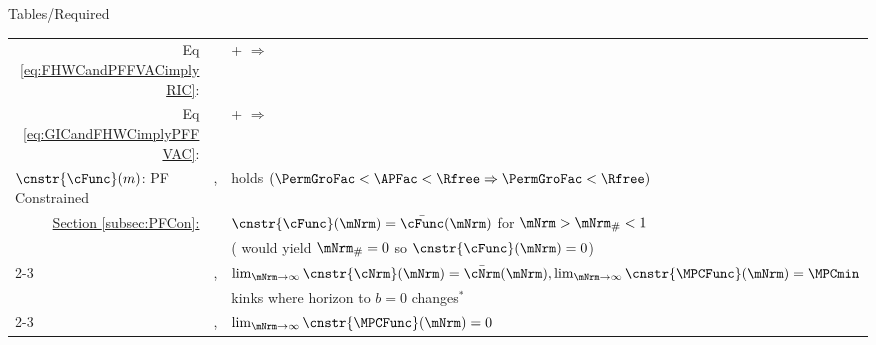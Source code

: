\documentclass[\econtexRoot/BufferStockTheory]{subfiles}
\providecommand{\TblName}{}
\renewcommand{\TblName}{Required}
\begin{document}
\begin{verbatimwrite}{Tables/\TblName}
\begin{table}
{\begin{tabular}{|l|l|l|}
        \\ \multicolumn{1}{|r|}{Eq \eqref{eq:FHWCandPFFVACimplyRIC}:}                                                                              &                                         & {\PFFVAC}+{\FHWC} $\Rightarrow$ {\RIC}         
        \\ \multicolumn{1}{|r|}{{Eq \eqref{eq:GICandFHWCimplyPFFVAC}}:}                                                                              &                                         & {\GICRaw}+{\FHWC} $\Rightarrow$ {\PFFVAC}         
        \\ \hline\hline \multicolumn{1}{|l|}{$\cnstr{\cFunc}(m)$: PF Constrained}                                              & \cncl{\GICRaw}, \RIC                    & {\FHWC} holds $(\PermGroFac < \APFac < \Rfree \Rightarrow \PermGroFac < \Rfree)$
        \\
        \multicolumn{1}{|r|}{\hyperlink{PF-Constrained-Solution}{Section \ref{subsec:PFCon}:}}                &                                         & $\cnstr{\cFunc}(\mNrm)=\bar{\cFunc}(\mNrm)$ for $\mNrm > \mNrm_{\#} < 1$
        \\                                                                                                                        &                                         & (\cncl{\RIC} would yield $\mNrm_{\#}=0$ so $\cnstr{\cFunc}(\mNrm)=0$)
        \\ \cline{2-3}  \multicolumn{1}{|r|}{\hyperlink{ApndxLiqConstr}{Appendix \ref{sec:ApndxLiqConstr}}:} & \GICRaw,\RIC                            & $\lim_{\mNrm \rightarrow \infty} \cnstr{\cNrm}(\mNrm)=\bar{\cNrm}(\mNrm), \lim_{\mNrm \rightarrow \infty} \cnstr{\MPCFunc}(\mNrm)=\MPCmin$                                                                                                                                                                       
        \\                                                                                                                        &                                         & kinks where horizon to $b=0$ changes$^{\ast}$
        \\ \cline{2-3}\multicolumn{1}{|r|}{\hyperlink{ApndxLiqConstr}{Appendix \ref{sec:ApndxLiqConstr}}:}  & \GICRaw,\cncl{\RIC}                     & $\lim_{\mNrm \rightarrow \infty}  \cnstr{\MPCFunc}(\mNrm)=0$

\end{tabular}}
\end{table}
\end{verbatimwrite}
\end{document}
